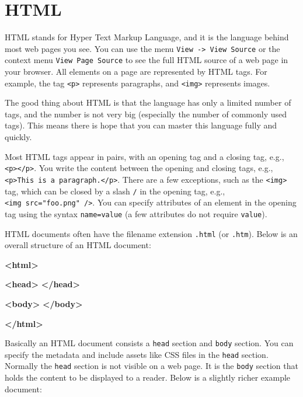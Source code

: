 \documentclass[12pt,]{krantz}
\makeatletter
\newenvironment{Shaded}{\begin{snugshade}}{\end{snugshade}}
\newcommand{\KeywordTok}[1]{\textcolor[rgb]{0.13,0.29,0.53}{\textbf{#1}}}
\newenvironment{kframe}{%
\medskip{}
\setlength{\fboxsep}{.8em}
 \def\at@end@of@kframe{}%
 \ifinner\ifhmode%
  \def\at@end@of@kframe{\end{minipage}}%
  \begin{minipage}{\columnwidth}%
 \fi\fi%
 \def\FrameCommand##1{\hskip\@totalleftmargin \hskip-\fboxsep
 \colorbox{shadecolor}{##1}\hskip-\fboxsep
     \hskip-\linewidth \hskip-\@totalleftmargin \hskip\columnwidth}%
 \MakeFramed {\advance\hsize-\width
   \@totalleftmargin\z@ \linewidth\hsize
   \@setminipage}}%
 {\par\unskip\endMakeFramed%
 \at@end@of@kframe}
\renewenvironment{Shaded}{\begin{kframe}}{\end{kframe}}
\theoremstyle{definition}
\theoremstyle{definition}
\theoremstyle{definition}
\theoremstyle{remark}
\makeatother
\begin{document}
\hypertarget{html}{%
\section{HTML}\label{html}}

HTML stands for Hyper Text Markup Language, and it is the
language behind most web pages you see. You can use the menu
\texttt{View\ -\textgreater{}\ View\ Source} or the context menu
\texttt{View\ Page\ Source} to see the full HTML source of a web page in
your browser. All elements on a page are represented by HTML tags. For
example, the tag \texttt{\textless{}p\textgreater{}} represents
paragraphs, and \texttt{\textless{}img\textgreater{}} represents images.

The good thing about HTML is that the language has only a limited number
of tags, and the number is not very big (especially the number of
commonly used tags). This means there is hope that you can master this
language fully and quickly.

Most HTML tags appear in pairs, with an opening tag and a closing tag,
e.g., \texttt{\textless{}p\textgreater{}\textless{}/p\textgreater{}}.
You write the content between the opening and closing tags, e.g.,
\texttt{\textless{}p\textgreater{}This\ is\ a\ paragraph.\textless{}/p\textgreater{}}.
There are a few exceptions, such as the
\texttt{\textless{}img\textgreater{}} tag, which can be closed by a
slash \texttt{/} in the opening tag, e.g.,
\texttt{\textless{}img\ src="foo.png"\ /\textgreater{}}. You can specify
attributes of an element in the opening tag using the syntax
\texttt{name=value} (a few attributes do not require \texttt{value}).

HTML documents often have the filename extension \texttt{.html} (or
\texttt{.htm}). Below is an overall structure of an HTML document:

\begin{Shaded}
\begin{Highlighting}[]
\KeywordTok{<html>}

  \KeywordTok{<head>}
  \KeywordTok{</head>}
  
  \KeywordTok{<body>}
  \KeywordTok{</body>}

\KeywordTok{</html>}
\end{Highlighting}
\end{Shaded}

Basically an HTML document consists a \texttt{head} section and
\texttt{body} section. You can specify the metadata and include assets
like CSS files in the \texttt{head} section. Normally the \texttt{head}
section is not visible on a web page. It is the \texttt{body} section
that holds the content to be displayed to a reader. Below is a slightly
richer example document:
\end{document}
